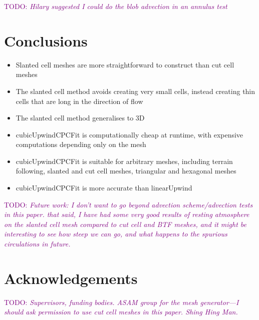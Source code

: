 \documentclass{article}
\newcommand{\TODO}[1]{\textcolor{purple}{TODO: \emph{#1}}}
\begin{document}
\TODO{Hilary suggested I could do the blob advection in an annulus test \citep{berger-helzel2012}}

\section{Conclusions}

\begin{itemize}
	\item Slanted cell meshes are more straightforward to construct than cut cell meshes
	\item The slanted cell method avoids creating very small cells, instead creating thin cells that are long in the direction of flow
	\item The slanted cell method generalises to 3D
	\item cubicUpwindCPCFit is computationally cheap at runtime, with expensive computations depending only on the mesh
	\item cubicUpwindCPCFit is suitable for arbitrary meshes, including terrain following, slanted and cut cell meshes, triangular and hexagonal meshes
	\item cubicUpwindCPCFit is more accurate than linearUpwind
\end{itemize}

\TODO{Future work: I don't want to go beyond advection scheme/advection tests in this paper.  that said, I have had some very good results of resting atmosphere on the slanted cell mesh compared to cut cell and BTF meshes, and it might be interesting to see how steep we can go, and what happens to the spurious circulations in future.}

\section{Acknowledgements}
\TODO{Supervisors, funding bodies.  ASAM group for the mesh generator---I should ask permission to use cut cell meshes in this paper.  Shing Hing Man.}



\end{document}

